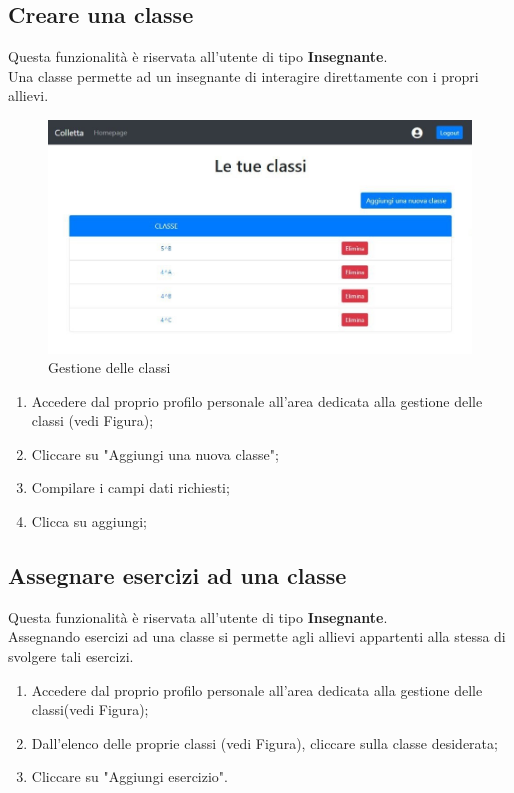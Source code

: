 \documentclass[11pt,a4paper]{article}
\begin{document}
{			
	\subsection{Creare una classe}
			Questa funzionalità è riservata all'utente di tipo \textbf{Insegnante}.\\
			Una classe permette ad un insegnante di interagire direttamente con i propri allievi.
				\begin{figure}[h!]
				\centering
				\includegraphics[scale=0.65]{images/classi.jpg}
				\caption{Gestione delle classi}
			\end{figure}
					\begin{enumerate}
			\item Accedere dal proprio profilo personale all'area dedicata alla gestione delle classi (vedi Figura);
			\item Cliccare su "Aggiungi una nuova classe";
			\item Compilare i campi dati richiesti;
			\item Clicca su aggiungi;
		\end{enumerate}
	\subsection{Assegnare esercizi ad una classe}
			Questa funzionalità è riservata all'utente di tipo \textbf{Insegnante}.\\
			Assegnando esercizi ad una classe si permette agli allievi appartenti alla stessa di svolgere tali esercizi.
			\begin{enumerate}
				\item Accedere dal proprio profilo personale all'area dedicata alla gestione delle classi(vedi Figura);
				\item Dall'elenco delle proprie classi (vedi Figura), cliccare sulla classe desiderata;
				\item Cliccare su "Aggiungi esercizio".
			\end{enumerate}
		
}
\end{document}
